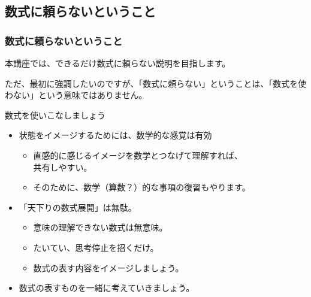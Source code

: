 \documentclass[12pt, dvipdfmx]{beamer}
\begin{document}
\subsection{数式に頼らないということ}
\begin{frame}
	\frametitle{数式に頼らないということ}
		本講座では、できるだけ数式に頼らない説明を目指します。
		
		ただ、最初に強調したいのですが、「数式に頼らない」ということは、「数式を使わない」という意味ではありません。
		\begin{alertblock}{数式を使いこなしましょう}
			\begin{itemize}
				\item 状態をイメージするためには、数学的な感覚は有効
					\begin{itemize}
						\item 直感的に感じるイメージを数学とつなげて理解すれば、\\
						共有しやすい。
						\item そのために、数学（算数？）的な事項の復習もやります。
					\end{itemize}
				\item 「天下りの数式展開」は無駄。
					\begin{itemize}
						\item 意味の理解できない数式は無意味。
						\item たいてい、思考停止を招くだけ。
						\item 数式の表す内容をイメージしましょう。
					\end{itemize}
				\item 数式の表すものを一緒に考えていきましょう。
			\end{itemize}
		\end{alertblock}
\end{frame}


\end{document}
